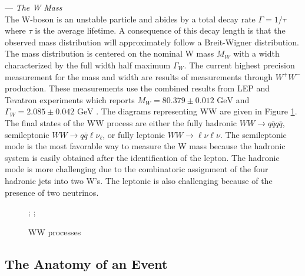 --- \textit {The W Mass}\\
The W-boson is an unstable particle and abides by a total decay rate $\Gamma = 1/\tau$ where $\tau$ is the average lifetime.  A consequence of this decay length is that the observed mass distribution will approximately follow a Breit-Wigner distribution. The mass distribution is centered on the nominal W mass $M_W$ with a width characterized by the full width half maximum $\Gamma_W$. The current highest precision measurement for the mass and width are results of measurements through $W^+W^-$ production. These measurements use the combined results from LEP and Tevatron experiments which reports $M_W = 80.379 \pm 0.012 \, \, \text{GeV} $ and $\Gamma_W = 2.085 \pm 0.042 \,  \,\text{GeV}$ \cite{pdg}. The diagrams representing WW are given in Figure \ref{fig:wwdiag}. The final states of the WW process are either the fully hadronic $WW\rightarrow q\bar{q}q\bar{q}$, semileptonic $WW\rightarrow q\bar{q}\ell\nu_{\ell}$, or fully leptonic $WW\rightarrow \ell \nu \ell \nu$. The semileptonic mode is the most favorable way to measure the W mass because the hadronic system is easily obtained after the identification of the lepton. The hadronic mode is more challenging due to the combinatoric assignment of the four hadronic jets into two W's. The leptonic is also challenging because of the presence of two neutrinos.


\begin{figure}
\centering
{};
    ;
\caption{\label{fig:wwdiag} WW processes }
\end{figure}

  

\subsection{The Anatomy of an Event}
\label{subsec:collphsx}


